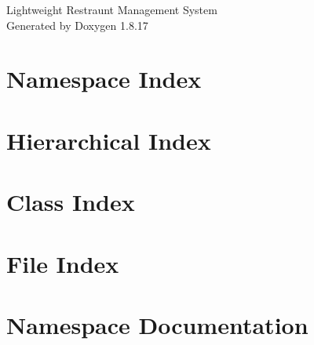 \let\mypdfximage\pdfximage\def\pdfximage{\immediate\mypdfximage}\documentclass[twoside]{book}
\newcommand{\+}{\discretionary{\mbox{\scriptsize$\hookleftarrow$}}{}{}}
\newcommand{\clearemptydoublepage}{%
  \newpage{\pagestyle{empty}\cleardoublepage}%
}
\begin{document}
\hypersetup{pageanchor=false,
             bookmarksnumbered=true,
             pdfencoding=unicode
            }
\begin{titlepage}
\vspace*{7cm}
\begin{center}%
{\Large Lightweight Restraunt Management System }\\
\vspace*{1cm}
{\large Generated by Doxygen 1.8.17}\\
\end{center}
\end{titlepage}
\clearemptydoublepage
{}
\tableofcontents
\clearemptydoublepage
{}
\hypersetup{pageanchor=true}

\chapter{Namespace Index}

\chapter{Hierarchical Index}

\chapter{Class Index}

\chapter{File Index}

\chapter{Namespace Documentation}


























\end{document}
